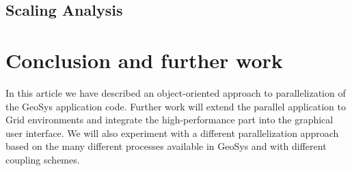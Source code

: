 \documentclass[10pt,a4paper,twocolumn]{article}
\begin{document}
\subsection{Scaling Analysis}


\section{Conclusion and further work}

In this article we have described an object-oriented approach to parallelization of the GeoSys application code. Further work will extend the parallel application to Grid environments and integrate the high-performance part into the graphical user interface. We will also experiment with a different parallelization approach based on the many different processes available in GeoSys and with different coupling schemes.
\end{document}
